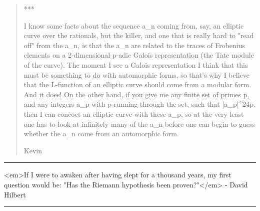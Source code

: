 \begin{quote}
 ***

 I know some facts about the sequence a_{n} coming from, say, an elliptic
 curve over the rationals, but the killer, and one that is really
 hard to "read off" from the a_{n}, is that the a_{n} are related to the
 traces of Frobenius elements on a 2-dimensional p-adic Galois representation
 (the Tate module of the curve).  The moment I see a Galois representation
 I think that this must be something to do with automorphic forms,
 so that's why I believe that the L-function of an elliptic
 curve should come from a modular form.  And it does!  On the other
 hand, if you give me any finite set of primes p, and any integers
 a_{p} with p running through the set, such that 
 |a_{p}|^{2}\le 4p, then
 I can concoct an elliptic curve with these a_{p}, so at the very
 least one has to look at infinitely many of the a_{n} before one
 can begin to guess whether the a_{n} come from an automorphic form.

 Kevin
\end{quote}

\par\noindent\rule{\textwidth}{0.4pt}
<em>If I were to awaken after having slept for a thousand years, my 
first question would be: "Has the Riemann hypothesis 
been proven?"</em> -
David Hilbert

\par\noindent\rule{\textwidth}{0.4pt}

